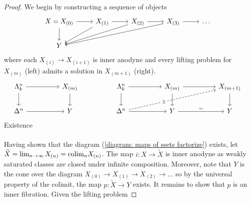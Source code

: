 \begin{proof}
  We begin by constructing a sequence of objects 
  \begin{equation}\label{diagram: maps of ssets factorize}
  \begin{tikzcd}
	{X=X_{(0)}} & {X_{(1)}} & {X_{(2)}} & {X_{(3)}} & \dots \\
	Y
	\arrow[from=1-1, to=1-2]
	\arrow[from=1-2, to=1-3]
	\arrow[from=1-3, to=1-4]
	\arrow[from=1-1, to=2-1]
	\arrow[from=1-2, to=2-1]
	\arrow[from=1-3, to=2-1]
	\arrow[from=1-4, to=1-5]
	\arrow[from=1-4, to=2-1]
  \end{tikzcd}
  \end{equation}
  where each $X_{(i)}\to X_{(i+1)}$ is inner anodyne and every lifting problem for $X_{(m)}$ (left) admits a solution in $X_{(m+1)}$ (right). 
  $$%
  \begin{tikzcd}
    {\Lambda^{n}_{k}} && {X_{(m)}} && {\Lambda^{n}_{k}} && {X_{(m)}} && {X_{(m+1)}} \\
    {\Delta^{n}} && Y && {\Delta^{n}} && Y && Y
    \arrow[from=1-1, to=1-3]
    \arrow[from=1-3, to=2-3]
    \arrow[from=1-1, to=2-1]
    \arrow[from=2-1, to=2-3]
    \arrow[from=1-5, to=2-5]
    \arrow[from=1-7, to=2-7]
    \arrow[from=1-9, to=2-9]
    \arrow[from=2-5, to=2-7]
    \arrow["\sim", from=2-7, to=2-9]
    \arrow[from=1-5, to=1-7]
    \arrow[from=1-7, to=1-9]
    \arrow["\exists"{description, pos=0.4}, dashed, from=2-5, to=1-9]
  \end{tikzcd}$$
  Existence
  \\\\
  Having shown that the diagram (\ref{diagram: maps of ssets factorize}) exists, let $\widetilde{X}=\lim_{n\to\infty}X_{(n)}=\mathrm{colim}_{n}X_{(n)}$. The map $i:X\to\widetilde{X}$ is inner anodyne as weakly saturated classes are closed under infinite composition. Moreover, note that $Y$ is the cone over the diagram $X_{(0)}\to X_{(1)}\to X_{(2)}\to\dots$ so by the universal property of the colimit, the map $p:\widetilde{X}\to Y$ exists. It remains to show that $p$ is an inner fibration. Given the lifting problem 

\end{proof}
